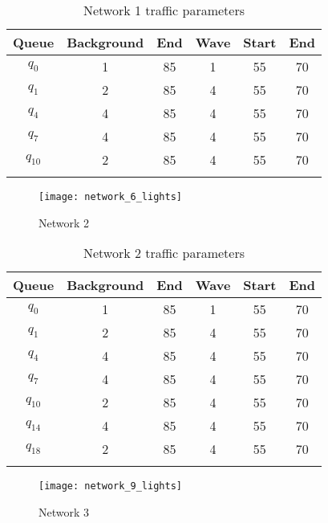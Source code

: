 \begin{table}[h]
\caption{Network 1 traffic parameters}
\label{tab:net1wave}
\centering
\begin{tabular}{cccccc}
\toprule
Queue & Background & End & Wave & Start &End\\ 
\midrule
$q_0$ & 1 & 85 & 1 & 55 & 70\\
$q_1$ & 2 & 85 & 4 & 55 & 70\\
$q_4$ & 4 & 85 & 4 & 55 & 70\\
$q_7$ & 4 & 85 & 4 & 55 & 70\\
$q_{10}$ & 2 & 85 & 4 & 55 & 70\\
\bottomrule\\
\end{tabular}
\end{table}


\begin{figure*}[t!]
\centering
\texttt{[image: network\_6\_lights]}
\caption{Network 2}
\label{fig:network6}
\end{figure*}

\begin{table}[h]
\caption{Network 2 traffic parameters}
\label{tab:net2wave}
\centering
\begin{tabular}{cccccc}
\toprule
Queue & Background & End & Wave & Start &End\\ 
\midrule
$q_0$ & 1 & 85 & 1 & 55 & 70\\
$q_1$ & 2 & 85 & 4 & 55 & 70\\
$q_4$ & 4 & 85 & 4 & 55 & 70\\
$q_7$ & 4 & 85 & 4 & 55 & 70\\
$q_{10}$ & 2 & 85 & 4 & 55 & 70\\
$q_{14}$ & 4 & 85 & 4 & 55 & 70\\
$q_{18}$ & 2 & 85 & 4 & 55 & 70\\
\bottomrule\\
\end{tabular}
\end{table}


\begin{figure*}[t!]
\centering
\texttt{[image: network\_9\_lights]}
\caption{Network 3}
\label{fig:network9}
\end{figure*}


